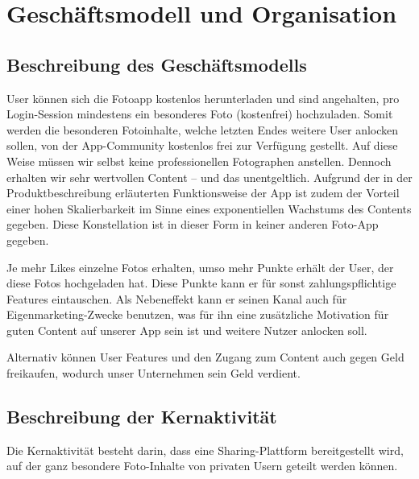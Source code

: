 \chapter{Geschäftsmodell und Organisation}


\section{Beschreibung des Geschäftsmodells}

User können sich die Fotoapp kostenlos herunterladen und sind angehalten, pro Login-Session mindestens ein besonderes Foto (kostenfrei) hochzuladen. Somit werden die besonderen Fotoinhalte, welche letzten Endes weitere User anlocken sollen, von der App-Community kostenlos frei zur Verfügung gestellt. Auf diese Weise müssen wir selbst keine professionellen Fotographen anstellen. Dennoch erhalten wir sehr wertvollen Content – und das unentgeltlich. Aufgrund der in der Produktbeschreibung erläuterten Funktionsweise der App ist zudem der Vorteil einer hohen Skalierbarkeit im Sinne eines exponentiellen Wachstums des Contents gegeben. Diese Konstellation ist in dieser Form in keiner anderen Foto-App gegeben.

Je mehr Likes einzelne Fotos erhalten, umso mehr Punkte erhält der User, der diese Fotos hochgeladen hat. Diese Punkte kann er für sonst zahlungspflichtige Features eintauschen. Als Nebeneffekt kann er seinen Kanal auch für Eigenmarketing-Zwecke benutzen, was für ihn eine zusätzliche Motivation für guten Content auf unserer App sein ist und weitere Nutzer anlocken soll.

Alternativ können User Features und den Zugang zum Content auch gegen Geld freikaufen, wodurch unser Unternehmen sein Geld verdient.


\section{Beschreibung der Kernaktivität}
Die Kernaktivität besteht darin, dass eine Sharing-Plattform bereitgestellt wird, auf der ganz besondere Foto-Inhalte von privaten Usern geteilt werden können.



